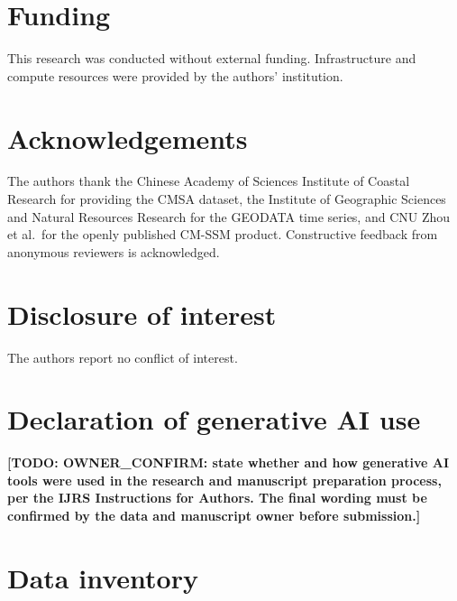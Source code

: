 \documentclass[11pt]{article}
\newcommand{\TODO}[1]{\textcolor{todocolor}{\textbf{[TODO: #1]}}}
\begin{document}
\section*{Funding}

This research was conducted without external funding. Infrastructure and compute
resources were provided by the authors' institution.

\section*{Acknowledgements}

The authors thank the Chinese Academy of Sciences Institute of Coastal Research
for providing the CMSA dataset, the Institute of Geographic Sciences and Natural
Resources Research for the GEODATA time series, and CNU Zhou et al.\ for the
openly published CM-SSM product. Constructive feedback from anonymous reviewers
is acknowledged.

\section*{Disclosure of interest}

The authors report no conflict of interest.

\section*{Declaration of generative AI use}

\TODO{OWNER\_CONFIRM: state whether and how generative AI tools were used in
the research and manuscript preparation process, per the IJRS Instructions
for Authors. The final wording must be confirmed by the data and manuscript
owner before submission.}




\appendix
\section{Data inventory}
\label{app:data}
\end{document}
